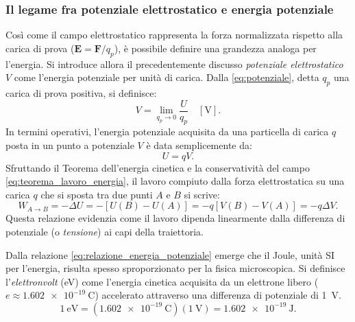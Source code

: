 \documentclass[a4paper,11pt]{report}
\begin{document}
\subsubsection{Il legame fra potenziale elettrostatico e energia potenziale}
Così come il campo elettrostatico rappresenta la forza normalizzata rispetto alla carica di prova ($\bm{E} = \bm{F}/q_p$), è possibile definire una grandezza analoga per l'energia. Si introduce allora il precedentemente discusso \textit{potenziale elettrostatico} $V$ come l'energia potenziale per unità di carica.
Dalla \eqref{eq:potenziale}, detta $q_p$ una carica di prova positiva, si definisce:
\begin{equation}
    V = \lim_{q_p \rightarrow 0} \frac{U}{q_p} \quad [\si{\volt}].
\end{equation}
In termini operativi, l'energia potenziale acquisita da una particella di carica $q$ posta in un punto a potenziale $V$ è data semplicemente da:
\begin{equation}
    U = qV.
    \label{eq:relazione_energia_potenziale}
\end{equation}
Sfruttando il Teorema dell'energia cinetica e la conservatività del campo \eqref{eq:teorema_lavoro_energia}, il lavoro compiuto dalla forza elettrostatica su una carica $q$ che si sposta tra due punti $A$ e $B$ si scrive:
\begin{equation}
    W_{A \to B} = -\Delta U = -[U(B)-U(A)] = -q[V(B)-V(A)] = -q\Delta V.
\end{equation}
Questa relazione evidenzia come il lavoro dipenda linearmente dalla differenza di potenziale (o \textit{tensione}) ai capi della traiettoria.


\begin{approfondimento}[title={Unità di energia: L'Elettronvolt}]
\noindent
Dalla relazione \eqref{eq:relazione_energia_potenziale} emerge che il Joule, unità SI per l'energia, risulta spesso sproporzionato per la fisica microscopica.
    Si definisce l'\textit{elettronvolt} (\si{\electronvolt}) come l'energia cinetica acquisita da un elettrone libero ($e \approx \SI{1.602e-19}{\coulomb}$) accelerato attraverso una differenza di potenziale di \SI{1}{\volt}.
    \begin{equation}
        \SI{1}{\electronvolt} = (\SI{1.602e-19}{\coulomb})(\SI{1}{\volt}) = \SI{1.602e-19}{\joule}.
    \end{equation}
\end{approfondimento}
\end{document}

